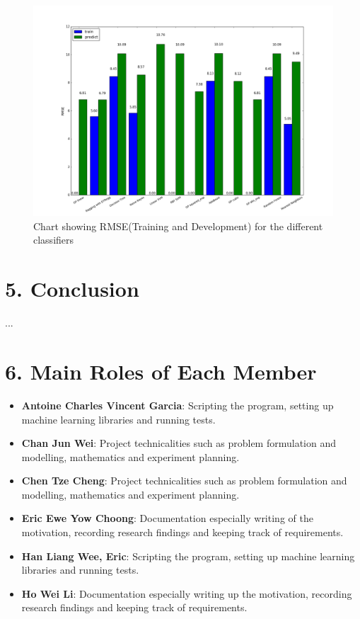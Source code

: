\documentclass{article}
\begin{document}
 \begin{figure}
  \includegraphics[width=\textwidth]{results}
  \caption{Chart showing RMSE(Training and Development) for the different classifiers}
  \label{rmse_results_chart}
 \end{figure}

	\section{5.  Conclusion}	
	... \\

	\section{6.  Main Roles of Each Member}
	\begin{itemize}
		\item \textbf{Antoine Charles Vincent Garcia}: 
		Scripting the program, setting up machine learning libraries and running tests.
		\item \textbf{Chan Jun Wei}: 
		Project technicalities such as problem formulation and modelling, mathematics and experiment planning.
		\item \textbf{Chen Tze Cheng}: 
		Project technicalities such as problem formulation and modelling, mathematics and experiment planning.
		\item \textbf{Eric Ewe Yow Choong}: 
		Documentation especially writing of the motivation, recording research findings and keeping track of requirements.
		\item \textbf{Han Liang Wee, Eric}: 
		Scripting the program, setting up machine learning libraries and running tests.
		\item \textbf{Ho Wei Li}: 
		Documentation especially writing up the motivation, recording research findings and keeping track of requirements.
	\end{itemize}
	
\end{document}
